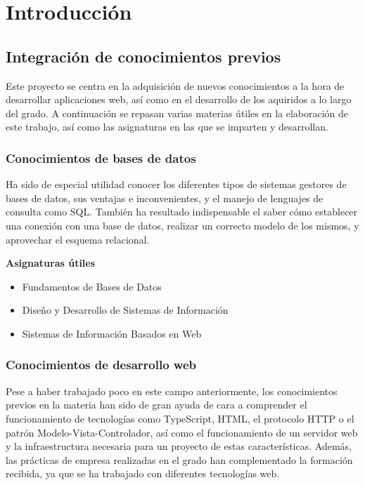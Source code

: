 \documentclass[10pt, a4paper]{aqademic}
\begin{document}
\newpage


\chapter{Introducción}

\section{Integración de conocimientos previos}

Este proyecto se centra en la adquisición de nuevos conocimientos a la hora de desarrollar aplicaciones web, así como en el desarrollo de los aquiridos a lo largo del grado. A continuación se repasan varias materias útiles en la elaboración de este trabajo, así como las asignaturas en las que se imparten y desarrollan.

\subsection*{Conocimientos de bases de datos}

Ha sido de especial utilidad conocer los diferentes tipos de sistemas gestores de bases de datos, sus ventajas e inconvenientes, y el manejo de lenguajes de 
consulta como SQL. También ha resultado indispensable el saber cómo establecer una conexión con una base de datos, realizar un correcto modelo de los mismos, 
y aprovechar el esquema relacional.

\textbf{Asignaturas útiles} 

\begin{itemize}
	\item Fundamentos de Bases de Datos
	\item Diseño y Desarrollo de Sistemas de Información
	\item Sistemas de Información Basados en Web
\end{itemize}


\subsection*{Conocimientos de desarrollo web}

Pese a haber trabajado poco en este campo anteriormente, los conocimientos previos en la materia han sido de gran ayuda de cara a comprender el funcionamiento de tecnologías como TypeScript, HTML, el protocolo HTTP o el patrón Modelo-Vista-Controlador, así como el funcionamiento de un servidor web y la infraestructura necesaria para un proyecto de estas características. Además, las prácticas de empresa realizadas en el grado han complementado la formación recibida, ya que se ha trabajado con diferentes tecnologías web.
\end{document}
